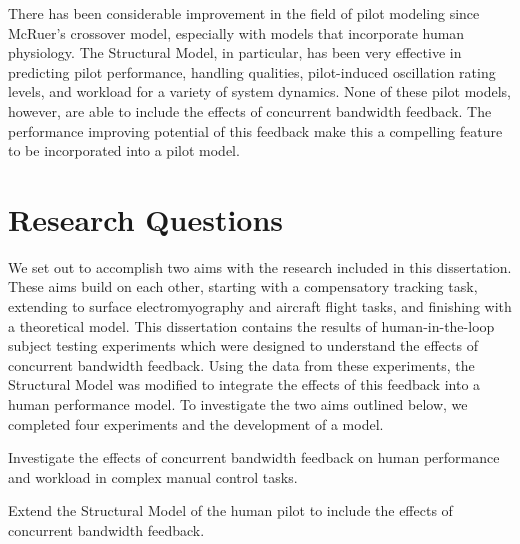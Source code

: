 There has been considerable improvement in the field of pilot modeling since McRuer's crossover model, especially with models that incorporate human physiology.
The Structural Model, in particular, has been very effective in predicting pilot performance, handling qualities, pilot-induced oscillation rating levels, and workload for a variety of system dynamics.
None of these pilot models, however, are able to include the effects of concurrent bandwidth feedback.
The performance improving potential of this feedback make this a compelling feature to be incorporated into a pilot model.


\section{Research Questions}
\label{sec:intro_questions}
We set out to accomplish two aims with the research included in this dissertation.
These aims build on each other, starting with a compensatory tracking task, extending to surface electromyography and aircraft flight tasks, and finishing with a theoretical model.
This dissertation contains the results of human-in-the-loop subject testing experiments which were designed to understand the effects of concurrent bandwidth feedback.
Using the data from these experiments, the Structural Model was modified to integrate the effects of this feedback into a human performance model.
To investigate the two aims outlined below, we completed four experiments and the development of a model.

\begin{description}[align=left]
    \item [Aim One] Investigate the effects of concurrent bandwidth feedback on human performance and workload in complex manual control tasks.
    \item [Aim Two] Extend the Structural Model of the human pilot to include the effects of concurrent bandwidth feedback.
\end{description}


